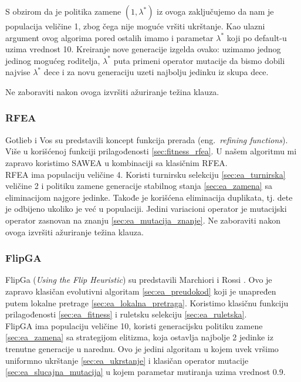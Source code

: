 \documentclass{article}
\begin{document}
S obzirom da je politika zamene  $(1,\lambda^*)$ iz ovoga zaključujemo da nam je populacija veličine 1, zbog čega nije moguće vršiti ukrštanje. 
Kao ulazni argument ovog algorima pored ostalih imamo i parametar $\lambda^*$ koji po default-u uzima vrednost 10. Kreiranje nove generacije izgelda ovako: uzimamo jednog jedinog mogućeg roditelja, $\lambda^*$ puta primeni operator mutacije da bismo dobili najvise $\lambda^*$ dece i za novu generaciju uzeti najbolju jedinku iz skupa dece.

Ne zaboraviti nakon ovoga izvršiti ažuriranje težina klauza.


\subsubsection{RFEA}
\label{sec:ea_rfea}
Gotlieb i Vos \cite{ea_with_table, ea_without_table} su predstavili koncept funkcija prerada (eng.~{\em refining functions}). Više u korišćenoj funkciji prilagođenosti \ref{sec:fitness_rfea}.
U našem algoritmu mi zapravo koristimo SAWEA u kombinaciji sa klasičnim RFEA. \\

RFEA ima populaciju veličine 4. Koristi turnirsku selekciju \ref{sec:ea_turnirska} veličine 2 i politiku zamene generacije stabilnog stanja \ref{sec:ea_zamena} sa eliminacijom najgore jedinke. Takođe je korišćena eliminacija duplikata, tj. dete je odbijeno ukoliko je već u populaciji.
Jedini variacioni operator je mutacijski operator zasnovan na znanju \ref{sec:ea_mutacija_znanje}.
Ne zaboraviti nakon ovoga izvršiti ažuriranje težina klauza.


\subsubsection{FlipGA}
\label{sec:ea_flipga}
FlipGa (\textit{Using the Flip Heuristic}) su predstavili Marchiori i Rossi \cite{ea_with_table}. Ovo je zapravo klasičan evolutivni algoritam \ref{sec:ea_preudokod}  koji je unapređen putem lokalne pretrage \ref{sec:ea_lokalna_pretraga}. Koristimo klasičnu funkciju prilagođenosti \ref{sec:ea_fitness} i ruletsku selekciju \ref{sec:ea_ruletska}. \\

FlipGA ima populaciju veličine 10, koristi generacijsku politiku zamene \ref{sec:ea_zamena} sa strategijom elitizma, koja ostavlja najbolje 2 jedinke iz trenutne generacije u narednu.	Ovo je jedini algoritam u kojem uvek vršimo uniformno ukrštanje \ref{sec:ea_ukrstanje} i klasičan operator mutacije \ref{sec:ea_slucajna_mutacija} u kojem parametar mutiranja uzima vrednost 0.9.
 
\end{document}
